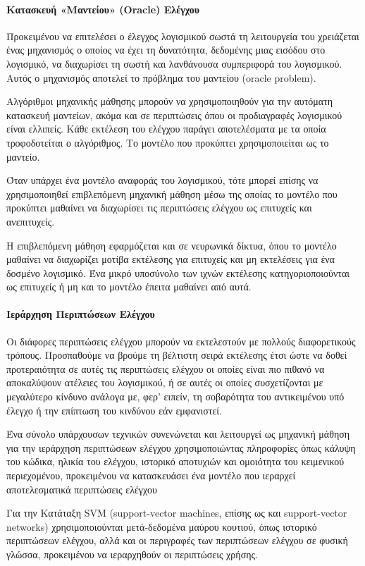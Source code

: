\documentclass[12pt]{article}
\begin{document}
\paragraph{Κατασκευή «Μαντείου» (Oracle) Ελέγχου}
Προκειμένου να επιτελέσει ο έλεγχος λογισμικού σωστά τη λειτουργεία του χρειάζεται ένας μηχανισμός ο οποίος να έχει τη δυνατότητα, δεδομένης μιας εισόδου στο λογισμικό, να διαχωρίσει τη σωστή και λανθάνουσα συμπεριφορά του λογισμικού. Αυτός ο μηχανισμός αποτελεί το πρόβλημα του μαντείου (oracle problem).
\par Αλγόριθμοι μηχανικής μάθησης μπορούν να χρησιμοποιηθούν για την αυτόματη κατασκευή μαντείων, ακόμα και σε περιπτώσεις όπου οι προδιαγραφές λογισμικού είναι ελλιπείς. Κάθε εκτέλεση του ελέγχου παράγει αποτελέσματα με τα οποία τροφοδοτείται ο αλγόριθμος. Το μοντέλο που προκύπτει χρησιμοποιείται ως το μαντείο.
\par Όταν υπάρχει ένα μοντέλο αναφοράς του λογισμικού, τότε μπορεί επίσης να χρησιμοποιηθεί επιβλεπόμενη μηχανική μάθηση μέσω της οποίας το μοντέλο που προκύπτει μαθαίνει να διαχωρίσει τις περιπτώσεις ελέγχου ως επιτυχείς και ανεπιτυχείς.
\par Η επιβλεπόμενη μάθηση εφαρμόζεται και σε νευρωνικά δίκτυα, όπου το μοντέλο μαθαίνει να διαχωρίζει μοτίβα εκτέλεσης για επιτυχείς και μη εκτελέσεις για ένα δοσμένο λογισμικό. Ένα μικρό υποσύνολο των ιχνών εκτέλεσης κατηγοριοποιούνται ως επιτυχείς ή μη και το μοντέλο έπειτα μαθαίνει από αυτά.

\paragraph{Ιεράρχηση Περιπτώσεων Ελέγχου}
Οι διάφορες περιπτώσεις ελέγχου μπορούν να εκτελεστούν με πολλούς διαφορετικούς τρόπους. Προσπαθούμε να βρούμε τη βέλτιστη σειρά εκτέλεσης έτσι ώστε να δοθεί προτεραιότητα σε αυτές τις περιπτώσεις ελέγχου οι οποίες είναι πιο πιθανό να αποκαλύψουν ατέλειες του λογισμικού, ή σε αυτές οι οποίες συσχετίζονται με μεγαλύτερο κίνδυνο ανάλογα με, φερ’ ειπείν, τη σοβαρότητα του αντικειμένου υπό έλεγχο ή την επίπτωση του κινδύνου εάν εμφανιστεί.
\par Ένα σύνολο υπάρχουσων τεχνικών συνενώνεται και λειτουργεί ως μηχανική μάθηση για την ιεράρχηση περιπτώσεων ελέγχου χρησιμοποιώντας πληροφορίες όπως κάλυψη του κώδικα, ηλικία του ελέγχου, ιστορικό αποτυχιών και ομοιότητα του κειμενικού περιεχομένου, προκειμένου να κατασκευάσει ένα μοντέλο που ιεραρχεί αποτελεσματικά περιπτώσεις ελέγχου
\par Για την Κατάταξη SVM (support-vector machines, επίσης ως και support-vector networks) χρησιμοποιούνται μετά-δεδομένα μαύρου κουτιού, όπως ιστορικό περιπτώσεων ελέγχου, αλλά και οι περιγραφές των περιπτώσεων ελέγχου σε φυσική γλώσσα, προκειμένου να ιεραρχηθούν οι περιπτώσεις χρήσης.
\end{document}
